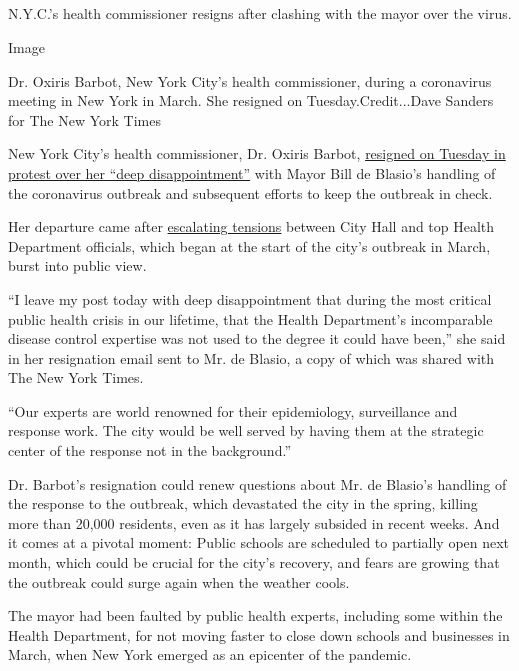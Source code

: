\hypertarget{-1}{%
\subsection{}\label{-1}}

N.Y.C.'s health commissioner resigns after clashing with the mayor over
the virus.

Image

Dr. Oxiris Barbot, New York City's health commissioner, during a
coronavirus meeting in New York in March. She resigned on
Tuesday.Credit...Dave Sanders for The New York Times

New York City's health commissioner, Dr. Oxiris Barbot,
\href{https://www.nytimes.com/2020/08/04/nyregion/oxiris-barbot-health-commissioner-resigns.html}{resigned
on Tuesday in protest over her ``deep disappointment''} with Mayor Bill
de Blasio's handling of the coronavirus outbreak and subsequent efforts
to keep the outbreak in check.

Her departure came after
\href{https://www.nytimes.com/2020/05/14/nyregion/coronavirus-de-blasio-mitchell-katz.html}{escalating
tensions} between City Hall and top Health Department officials, which
began at the start of the city's outbreak in March, burst into public
view.

``I leave my post today with deep disappointment that during the most
critical public health crisis in our lifetime, that the Health
Department's incomparable disease control expertise was not used to the
degree it could have been,'' she said in her resignation email sent to
Mr. de Blasio, a copy of which was shared with The New York Times.

``Our experts are world renowned for their epidemiology, surveillance
and response work. The city would be well served by having them at the
strategic center of the response not in the background.''

Dr. Barbot's resignation could renew questions about Mr. de Blasio's
handling of the response to the outbreak, which devastated the city in
the spring, killing more than 20,000 residents, even as it has largely
subsided in recent weeks. And it comes at a pivotal moment: Public
schools are scheduled to partially open next month, which could be
crucial for the city's recovery, and fears are growing that the outbreak
could surge again when the weather cools.

The mayor had been faulted by public health experts, including some
within the Health Department, for not moving faster to close down
schools and businesses in March, when New York emerged as an epicenter
of the pandemic.

